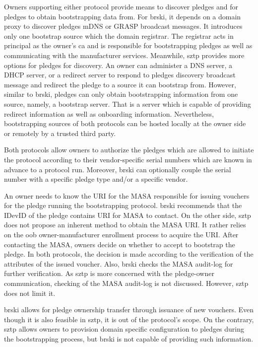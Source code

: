 \par
Owners supporting either protocol provide means to discover pledges and for pledges to obtain bootstrapping data from. For \gls{brski}, it depends on a domain proxy to discover pledges mDNS or GRASP broadcast messages. It introduces only one bootstrap source which the domain registrar. The registrar acts in principal as the owner's \gls{ca} and is responsible for bootstrapping pledges as well as communicating with the manufacturer services. Meanwhile, \gls{sztp} provides more options for pledges for discovery. An owner can administer a DNS server, a DHCP server, or a redirect server to respond to pledges discovery broadcast message and redirect the pledge to a source it can bootstrap from. However, similar to \gls{brski}, pledges can only obtain bootstrapping information from one source, namely, a bootstrap server. That is a server which is capable of providing redirect information as well as onboarding information. Nevertheless, bootstrapping sources of both protocols can be hosted locally at the owner side or remotely by a trusted third party.
\par
Both protocols allow owners to authorize the pledges which are allowed to initiate the protocol according to their vendor-specific serial numbers which are known in advance to a protocol run. 
Moreover, \gls{brski} can optionally couple the serial number with a specific pledge type and/or a specific vendor.
\par
An owner needs to know the URI for the MASA responsible for issuing vouchers for the pledge running the bootstrapping protocol. \gls{brski} recommends that the IDevID of the pledge contains URI for MASA to contact. On the other side, \gls{sztp} does not propose an inherent method to obtain the MASA URI. It rather relies on the \gls{oob} owner-manufacturer enrollment process to acquire the URI. After contacting the MASA, owners decide on whether to accept to bootstrap the pledge. In both protocols, the decision is made according to the verification of the attributes of the issued voucher. Also, \gls{brski} checks the MASA audit-log for further verification. As \gls{sztp} is more concerned with the pledge-owner communication, checking of the MASA audit-log is not discussed. However, \gls{sztp} does not limit it.
\par
\gls{brski} allows for pledge ownership transfer through issuance of new vouchers. Even though it is also feasible in \gls{sztp}, it is out of the protocol's scope. On the contrary, \gls{sztp} allows owners to provision domain specific configuration to pledges during the bootstrapping process, but \gls{brski} is not capable of providing such information.
